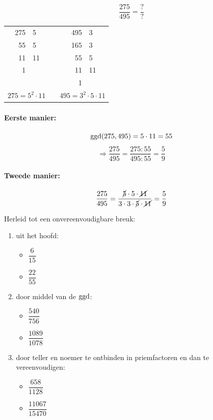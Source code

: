 \documentclass{bis}
\begin{document}
\begin{voorbeeld}
\[\dfrac{275}{495}=\dfrac{?}{?}\]

\begin{center}
\begin{tabular}{r|lp{2cm}r|l}
275 & 5 & & 495 & 3\\
55 & 5 & &  165 & 3\\
11 & 11  & &  55 & 5\\
1 &   & &   11 & 11\\
  &   & &    1 &\\
\multicolumn{2}{c}{$275=5^2\cdot 11$}&&\multicolumn{2}{c}{$495=3^2\cdot 5\cdot 11$}
\end{tabular}
\end{center}

\paragraph*{Eerste manier:}
\[\ggd(275, 495)=5  \cdot 11 = 55\]
\[\Rightarrow \dfrac{275}{495}=\dfrac{275:55}{495:55}=\dfrac{5}{9}\]

\paragraph*{Tweede manier:}
\[\dfrac{275}{495}=\dfrac{\cancel{5}\cdot 5\cdot \cancel{11}}{3 \cdot 3 \cdot \cancel{5} \cdot \cancel{11}}=\dfrac{5}{9}\]

\end{voorbeeld}

\begin{exercise}
Herleid tot een onvereenvoudigbare breuk:
\begin{enumerate}
  \item uit het hoofd:
  \begin{itemize}
    \item $\dfrac{6}{15}$
    \item $\dfrac{22}{55}$
  \end{itemize}
  \item door middel van de $\ggd$:
  \begin{itemize}
    \item $\dfrac{540}{756}$
    \item $\dfrac{1089}{1078}$
  \end{itemize}
  \item door teller en noemer te ontbinden in priemfactoren en dan te vereenvoudigen:
  \begin{itemize}
    \item $\dfrac{658}{1128}$
    \item $\dfrac{11067}{15470}$
  \end{itemize}
\end{enumerate}
\end{exercise}
\end{document}
